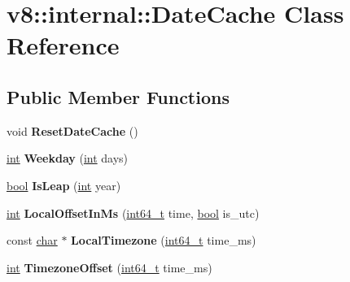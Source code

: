 \hypertarget{classv8_1_1internal_1_1DateCache}{}\section{v8\+:\+:internal\+:\+:Date\+Cache Class Reference}
\label{classv8_1_1internal_1_1DateCache}
\subsection*{Public Member Functions}
\begin{DoxyCompactItemize}
\item 
\mbox{\label{classv8_1_1internal_1_1DateCache_a234d6747df82eeccae3686cc030d6877}} 
void {\bfseries Reset\+Date\+Cache} ()
\item 
\mbox{\label{classv8_1_1internal_1_1DateCache_aa83122db4a93e0492adaad825749a689}} 
\mbox{\hyperlink{classint}{int}} {\bfseries Weekday} (\mbox{\hyperlink{classint}{int}} days)
\item 
\mbox{\label{classv8_1_1internal_1_1DateCache_a215a3a32269cfc00a9f682acaf52593c}} 
\mbox{\hyperlink{classbool}{bool}} {\bfseries Is\+Leap} (\mbox{\hyperlink{classint}{int}} year)
\item 
\mbox{\label{classv8_1_1internal_1_1DateCache_a573715c163a5f765fb6167d5eae13d85}} 
\mbox{\hyperlink{classint}{int}} {\bfseries Local\+Offset\+In\+Ms} (\mbox{\hyperlink{classint64__t}{int64\+\_\+t}} time, \mbox{\hyperlink{classbool}{bool}} is\+\_\+utc)
\item 
\mbox{\label{classv8_1_1internal_1_1DateCache_a72f75a025482ea24097a84680ea692e6}} 
const \mbox{\hyperlink{classchar}{char}} $\ast$ {\bfseries Local\+Timezone} (\mbox{\hyperlink{classint64__t}{int64\+\_\+t}} time\+\_\+ms)
\item 
\mbox{\label{classv8_1_1internal_1_1DateCache_acdfa35aaa92db20cffd304ffb6bf1e45}} 
\mbox{\hyperlink{classint}{int}} {\bfseries Timezone\+Offset} (\mbox{\hyperlink{classint64__t}{int64\+\_\+t}} time\+\_\+ms)
\item 

\end{DoxyCompactItemize}
